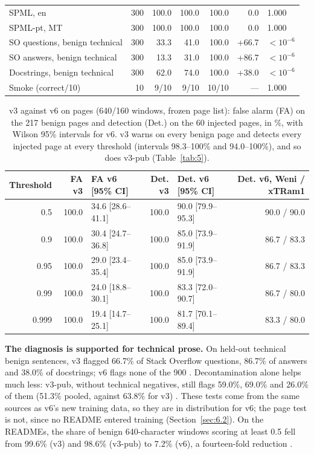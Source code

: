 \documentclass[11pt]{article}
\begin{document}
\begin{table}[tbp]
\begin{tabularx}{\linewidth}{@{}>{\raggedright\arraybackslash\hsize=1.00\hsize}Xrrrrrl@{}}
SPML, en & 300 & 100.0 & 100.0 & 100.0 & 0.0 & 1.000 \\
SPML-pt, MT & 300 & 100.0 & 100.0 & 100.0 & 0.0 & 1.000 \\
SO questions, benign technical & 300 & 33.3 & 41.0 & 100.0 & +66.7 & $<10^{-6}$ \\
SO answers, benign technical & 300 & 13.3 & 31.0 & 100.0 & +86.7 & $<10^{-6}$ \\
Docstrings, benign technical & 300 & 62.0 & 74.0 & 100.0 & +38.0 & $<10^{-6}$ \\
Smoke (correct/10) & 10 & 9/10 & 9/10 & 10/10 & — & 1.000 %
 \\
\bottomrule
\end{tabularx}
\end{table}

\begin{table}[tbp]
\centering
\small
\caption{v3 against v6 on pages (640/160 windows, frozen page list): false alarm (FA) on the 217 benign pages and detection (Det.) on the 60 injected pages, in \%, with Wilson 95\% intervals for v6. v3 warns on every benign page and detects every injected page at every threshold (intervals 98.3–100\% and 94.0–100\%), and so does v3-pub (Table~\ref{tab:5}).}\label{tab:11}
\begin{tabular}{@{}rrlrlr@{}}
\toprule
Threshold & FA v3 & FA v6 [95\% CI] & Det. v3 & Det. v6 [95\% CI] & Det. v6, Weni / xTRam1 \\
\midrule
0.5 & 100.0 & 34.6 [28.6–41.1] & 100.0 & 90.0 [79.9–95.3] & 90.0 / 90.0 \\
0.9 & 100.0 & 30.4 [24.7–36.8] & 100.0 & 85.0 [73.9–91.9] & 86.7 / 83.3 \\
0.95 & 100.0 & 29.0 [23.4–35.4] & 100.0 & 85.0 [73.9–91.9] & 86.7 / 83.3 \\
0.99 & 100.0 & 24.0 [18.8–30.1] & 100.0 & 83.3 [72.0–90.7] & 86.7 / 80.0 \\
0.999 & 100.0 & 19.4 [14.7–25.1] & 100.0 & 81.7 [70.1–89.4] & 83.3 / 80.0 %
 \\
\bottomrule
\end{tabular}
\end{table}

\textbf{The diagnosis is supported for technical prose.} On held-out technical benign sentences, v3 flagged 66.7\% of Stack Overflow questions, 86.7\% of answers and 38.0\% of docstrings; v6 flags none of the 900%
. Decontamination alone helps much less: v3-pub, without technical negatives, still flags 59.0\%, 69.0\% and 26.0\% of them (51.3\% pooled, against 63.8\% for v3)%
. These tests come from the same sources as v6's new training data, so they are in distribution for v6; the page test is not, since no README entered training (Section~\ref{sec:6.2}). On the READMEs, the share of benign 640-character windows scoring at least 0.5 fell from 99.6\% (v3) and 98.6\% (v3-pub) to 7.2\% (v6), a fourteen-fold reduction%
.
\end{document}
